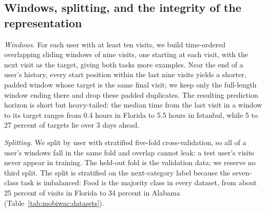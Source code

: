\subsection{Windows, splitting, and the integrity of the representation}
\label{sec:mobiwac:setup-windows}
\emph{Windows.} For each user with at least ten visits, we build time-ordered overlapping sliding windows of nine visits, one starting at each visit, with the next visit as the target, giving both tasks more examples. Near the end of a user's history, every start position within the last nine visits yields a shorter, padded window whose target is the same final visit; we keep only the full-length window ending there and drop these padded duplicates. The resulting prediction horizon is short but heavy-tailed: the median time from the last visit in a window to its target ranges from 0.4 hours in Florida to 5.5 hours in Istanbul, while 5 to 27 percent of targets lie over 3 days ahead.

\emph{Splitting.} We split by user with stratified five-fold cross-validation, so all of a user's windows fall in the same fold and overlap cannot leak: a test user's visits never appear in training. The held-out fold is the validation data; we reserve no third split. The split is stratified on the next-category label because the seven-class task is imbalanced: Food is the majority class in every dataset, from about 25 percent of visits in Florida to 34 percent in Alabama (Table~\ref{tab:mobiwac:datasets}).

